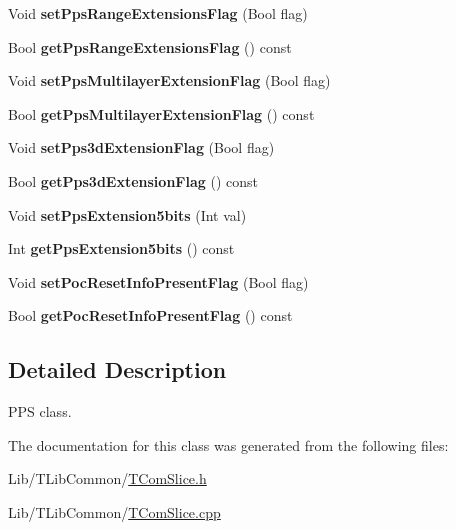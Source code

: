 \begin{DoxyCompactItemize}
Void {\bfseries set\+Pps\+Range\+Extensions\+Flag} (Bool flag)
\item 
\mbox{\label{class_t_com_p_p_s_a1eaa48ea6ead60939cd3a642862732fd}} 
Bool {\bfseries get\+Pps\+Range\+Extensions\+Flag} () const
\item 
\mbox{\label{class_t_com_p_p_s_ad9aff40580f3568a45c71881e0007cd8}} 
Void {\bfseries set\+Pps\+Multilayer\+Extension\+Flag} (Bool flag)
\item 
\mbox{\label{class_t_com_p_p_s_ac8c716f121aedf81bd64c2f89375b710}} 
Bool {\bfseries get\+Pps\+Multilayer\+Extension\+Flag} () const
\item 
\mbox{\label{class_t_com_p_p_s_a62ad1e78cc61cd9c381ba054584cbc0d}} 
Void {\bfseries set\+Pps3d\+Extension\+Flag} (Bool flag)
\item 
\mbox{\label{class_t_com_p_p_s_aeeb2e250550b9ff3fb8350be9af9195e}} 
Bool {\bfseries get\+Pps3d\+Extension\+Flag} () const
\item 
\mbox{\label{class_t_com_p_p_s_a145da6a9d8a494e54effb3ee61ecc7bb}} 
Void {\bfseries set\+Pps\+Extension5bits} (Int val)
\item 
\mbox{\label{class_t_com_p_p_s_aceccba449da9d4cdb67768d6dcb81ae7}} 
Int {\bfseries get\+Pps\+Extension5bits} () const
\item 
\mbox{\label{class_t_com_p_p_s_a787ae7ba83195cdbb9f33d64807d3665}} 
Void {\bfseries set\+Poc\+Reset\+Info\+Present\+Flag} (Bool flag)
\item 
\mbox{\label{class_t_com_p_p_s_ac6394e18f20d42b399a362ccbe45ac06}} 
Bool {\bfseries get\+Poc\+Reset\+Info\+Present\+Flag} () const
\end{DoxyCompactItemize}
{\bf }\par



\subsection{Detailed Description}
P\+PS class. 

The documentation for this class was generated from the following files\+:\begin{DoxyCompactItemize}
\item 
Lib/\+T\+Lib\+Common/\hyperlink{_t_com_slice_8h}{T\+Com\+Slice.\+h}\item 
Lib/\+T\+Lib\+Common/\hyperlink{_t_com_slice_8cpp}{T\+Com\+Slice.\+cpp}\end{DoxyCompactItemize}
